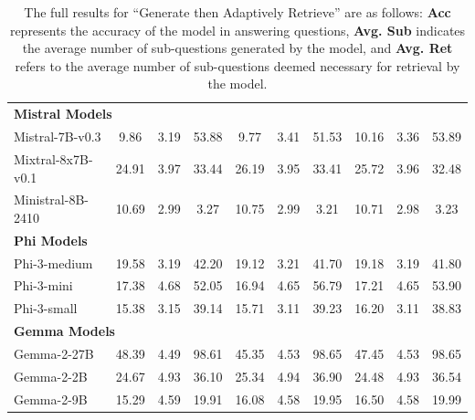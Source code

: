 \begin{table}[ht]
\begin{tabular}{l|ccc|ccc|ccc}
\hline
\multicolumn{10}{l}{\textbf{Mistral Models}} \\
Mistral\mbox{-}7B\mbox{-}v0.3 & 9.86 & 3.19 & 53.88 & 9.77 & 3.41 & 51.53 & 10.16 & 3.36 & 53.89 \\
Mixtral\mbox{-}8x7B\mbox{-}v0.1 & 24.91 & 3.97 & 33.44 & 26.19 & 3.95 & 33.41 & 25.72 & 3.96 & 32.48 \\
Ministral\mbox{-}8B\mbox{-}2410 & 10.69 & 2.99 & 3.27 & 10.75 & 2.99 & 3.21 & 10.71 & 2.98 & 3.23 \\
\hline
\multicolumn{10}{l}{\textbf{Phi Models}} \\
Phi\mbox{-}3\mbox{-}medium & 19.58 & 3.19 & 42.20 & 19.12 & 3.21 & 41.70 & 19.18 & 3.19 & 41.80 \\
Phi\mbox{-}3\mbox{-}mini & 17.38 & 4.68 & 52.05 & 16.94 & 4.65 & 56.79 & 17.21 & 4.65 & 53.90 \\
Phi\mbox{-}3\mbox{-}small & 15.38 & 3.15 & 39.14 & 15.71 & 3.11 & 39.23 & 16.20 & 3.11 & 38.83 \\
\hline
\multicolumn{10}{l}{\textbf{Gemma Models}} \\
Gemma\mbox{-}2\mbox{-}27B & 48.39 & 4.49 & 98.61 & 45.35 & 4.53 & 98.65 & 47.45 & 4.53 & 98.65 \\
Gemma\mbox{-}2\mbox{-}2B & 24.67 & 4.93 & 36.10 & 25.34 & 4.94 & 36.90 & 24.48 & 4.93 & 36.54 \\
Gemma\mbox{-}2\mbox{-}9B & 15.29 & 4.59 & 19.91 & 16.08 & 4.58 & 19.95 & 16.50 & 4.58 & 19.99 \\
\hline
\end{tabular}
\caption{The full results for ``Generate then Adaptively Retrieve'' are as follows: \textbf{Acc} represents the accuracy of the model in answering questions, \textbf{Avg. Sub} indicates the average number of sub-questions generated by the model, and \textbf{Avg. Ret} refers to the average number of sub-questions deemed necessary for retrieval by the model.}
\label{tab:dynamic-generate-full}
\end{table}


